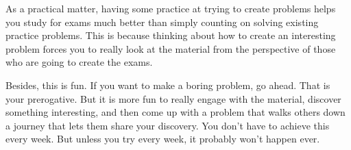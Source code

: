 As a practical matter, having some practice at trying to create
problems helps you study for exams much better than simply counting on
solving existing practice problems. This is because thinking about how
to create an interesting problem forces you to really look at the
material from the perspective of those who are going to create the
exams. 

Besides, this is fun. If you want to make a boring problem, go
ahead. That is your prerogative. But it is more fun to really engage
with the material, discover something interesting, and then come up
with a problem that walks others down a journey that lets them share
your discovery. You don't have to achieve this every week. But unless
you try every week, it probably won't happen ever. 